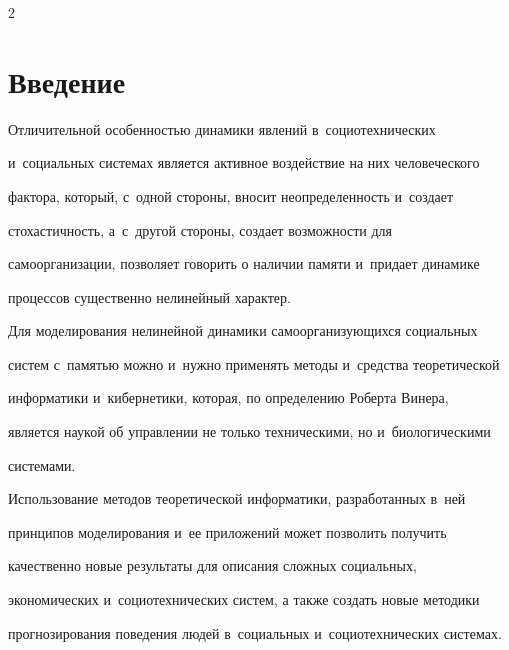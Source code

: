 \begin{multicols}{2}





\label{st\stat}





\section{Введение}





  Отличительной особенностью динамики явлений в~социотехнических 


и~социальных системах является активное воздействие на них человеческого 


фактора, который, с~одной стороны, вносит неопределенность и~создает 


стохастичность, а~с~другой стороны, создает возможности для 


самоорганизации, позволяет говорить о наличии памяти и~придает динамике 


процессов существенно нелинейный характер.


  


  Для моделирования нелинейной динамики самоорганизующихся социальных 


систем с~памятью можно и~нужно применять методы и~средства теоретической 


информатики и~кибернетики, которая, по определению Роберта Винера, 


является наукой об управлении не только техническими, но и~биологическими 


системами.


  


  Использование методов теоретической информатики, разработанных в~ней 


принципов моделирования и~ее приложений может позволить получить 


качественно новые результаты для описания сложных социальных, 


экономических и~социотехнических систем, а также создать новые методики 


прогнозирования поведения людей в~социальных и~социотехнических системах.








\end{multicols}
